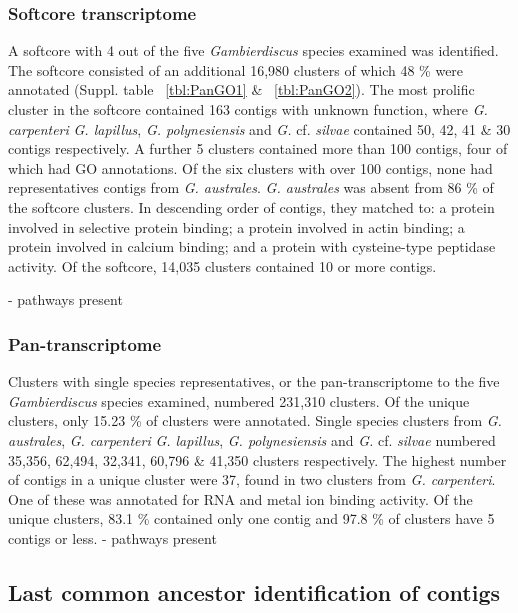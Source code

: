 \documentclass[12pt]{article}
\begin{document}
\subsubsection*{Softcore transcriptome}
A softcore with 4 out of the five \textit{Gambierdiscus} species examined was identified. 
The softcore consisted of an additional 16,980 clusters of which 48 \% were annotated  (Suppl. table ~\ref{tbl:PanGO1} \& ~\ref{tbl:PanGO2}). 
The most prolific cluster in the softcore contained 163 contigs with unknown function, where \textit{G. carpenteri} \textit{G. lapillus}, \textit{G. polynesiensis} and \textit{G.} cf. \textit{silvae} contained 50, 42, 41 \& 30 contigs respectively. 
A further 5 clusters contained more than 100 contigs, four of which had GO annotations. 
Of the six clusters with over 100 contigs, none had representatives contigs from \textit{G. australes}. 
\textit{G. australes} was absent from 86 \% of the softcore clusters. 
In descending order of contigs, they matched to: a protein involved in selective protein binding; a protein involved in actin binding; a protein involved in calcium binding; and a protein with cysteine-type peptidase activity. 
Of the softcore, 14,035 clusters contained 10 or more contigs. 

- pathways present\\

\subsubsection*{Pan-transcriptome}
Clusters with single species representatives, or the pan-transcriptome to the five \textit{Gambierdiscus} species examined, numbered 231,310 clusters. 
Of the unique clusters, only 15.23 \% of clusters were annotated. 
Single species clusters from \emph{G. australes}, \textit{G. carpenteri} \textit{G. lapillus}, \textit{G. polynesiensis} and \textit{G.} cf. \textit{silvae} numbered 35,356, 62,494, 32,341, 60,796 \& 41,350 clusters respectively. 
The highest number of contigs in a unique cluster were 37, found in two clusters from \textit{G. carpenteri}. 
One of these was annotated for RNA and metal ion binding activity. 
Of the unique clusters, 83.1 \% contained only one contig and 97.8 \% of clusters have 5 contigs or less. 
- pathways present\\

\subsection*{Last common ancestor identification of contigs}
\end{document}
